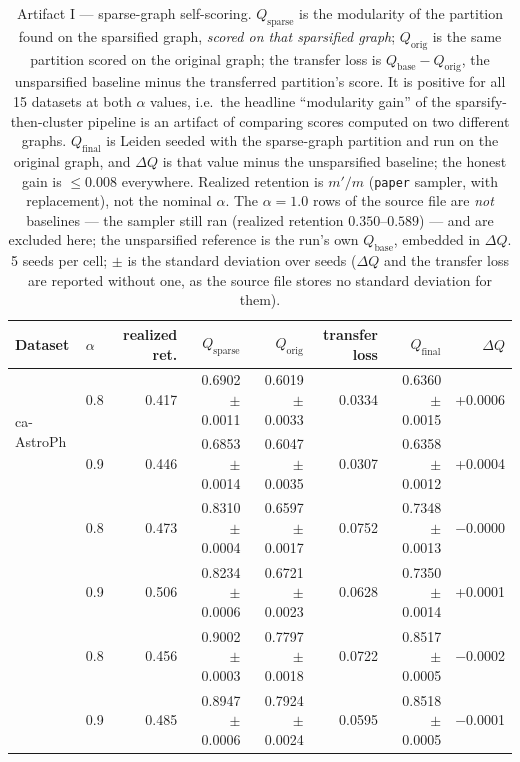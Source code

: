 \begin{table}[t]
\centering
\setlength{\tabcolsep}{5pt}
\caption{Artifact I --- sparse-graph self-scoring. $Q_{\mathrm{sparse}}$ is the modularity of the
partition found on the sparsified graph, \emph{scored on that sparsified graph}; $Q_{\mathrm{orig}}$
is the same partition scored on the original graph; the transfer loss is
$Q_{\mathrm{base}}-Q_{\mathrm{orig}}$, the unsparsified baseline minus the transferred partition's score. It is positive for all 15 datasets at both $\alpha$ values,
i.e.\ the headline ``modularity gain'' of the sparsify-then-cluster pipeline is an artifact of
comparing scores computed on two different graphs. $Q_{\mathrm{final}}$ is Leiden seeded with the
sparse-graph partition and run on the original graph, and $\Delta Q$ is that value minus the
unsparsified baseline; the honest gain is $\le 0.008$ everywhere.
Realized retention is $m'/m$ (\texttt{paper} sampler, with replacement), not the nominal $\alpha$.
The $\alpha=1.0$ rows of the source file are \emph{not} baselines --- the sampler still ran
(realized retention $0.350$--$0.589$) --- and are excluded here; the unsparsified reference is the
run's own $Q_{\mathrm{base}}$, embedded in $\Delta Q$.
5 seeds per cell; $\pm$ is the standard deviation over seeds ($\Delta Q$ and the transfer loss are
reported without one, as the source file stores no standard deviation for them).}
\label{tab:transfer_loss}
\footnotesize
\begin{tabular}{llrrrrrr}
\toprule
Dataset & $\alpha$ & realized ret. & $Q_{\mathrm{sparse}}$ & $Q_{\mathrm{orig}}$
 & transfer loss & $Q_{\mathrm{final}}$ & $\Delta Q$ \\
\midrule
\multirow{2}{*}{ca-AstroPh} & 0.8 & 0.417 & 0.6902 $\pm$ 0.0011 & 0.6019 $\pm$ 0.0033 & 0.0334 & 0.6360 $\pm$ 0.0015 & +0.0006 \\
 & 0.9 & 0.446 & 0.6853 $\pm$ 0.0014 & 0.6047 $\pm$ 0.0035 & 0.0307 & 0.6358 $\pm$ 0.0012 & +0.0004 \\
\addlinespace[2pt]
\multirow{2}{*}{ca-CondMat} & 0.8 & 0.473 & 0.8310 $\pm$ 0.0004 & 0.6597 $\pm$ 0.0017 & 0.0752 & 0.7348 $\pm$ 0.0013 & $-$0.0000 \\
 & 0.9 & 0.506 & 0.8234 $\pm$ 0.0006 & 0.6721 $\pm$ 0.0023 & 0.0628 & 0.7350 $\pm$ 0.0014 & +0.0001 \\
\addlinespace[2pt]
\multirow{2}{*}{ca-GrQc} & 0.8 & 0.456 & 0.9002 $\pm$ 0.0003 & 0.7797 $\pm$ 0.0018 & 0.0722 & 0.8517 $\pm$ 0.0005 & $-$0.0002 \\
 & 0.9 & 0.485 & 0.8947 $\pm$ 0.0006 & 0.7924 $\pm$ 0.0024 & 0.0595 & 0.8518 $\pm$ 0.0005 & $-$0.0001 \\

\end{tabular}
\end{table}
